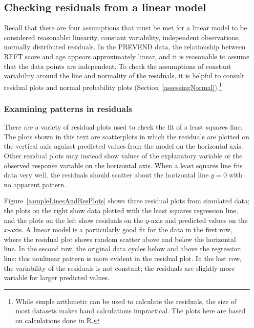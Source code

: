 \subsection{Checking residuals from a linear model}
\label{checkingResiduals}


Recall that there are four assumptions that must be met for a linear model to be considered reasonable: linearity, constant variability, independent observations, normally distributed residuals. In the PREVEND data, the relationship between RFFT score and age appears approximately linear, and it is reasonable to assume that the data points are independent. To check the assumptions of constant variability around the line and normality of the residuals, it is helpful to consult residual plots and normal probability plots (Section~\ref{assessingNormal}).\footnote{While simple arithmetic can be used to calculate the residuals, the size of most datasets makes hand calculations impractical. The plots here are based on calculations done in \textsf{R}.}

\subsubsection{Examining patterns in residuals}

There are a variety of residual plots used to check the fit of a least squares line. The plots shown in this text are scatterplots in which the residuals are plotted on the vertical axis against predicted values from the model on the horizontal axis. Other residual plots may instead show values of the explanatory variable or the observed response variable on the horizontal axis. When a least squares line fits data very well, the residuals should scatter about the horizontal line $y = 0$ with no apparent pattern.

Figure~\ref{sampleLinesAndResPlots} shows three residual plots from simulated data; the plots on the right show data plotted with the least squares regression line, and the plots on the left show residuals on the $y$-axis and predicted values on the $x$-axis. A linear model is a particularly good fit for the data in the first row, where the residual plot shows random scatter above and below the horizontal line. In the second row, the original data cycles below and above the regression line; this nonlinear pattern is more evident in the residual plot. In the last row, the variability of the residuals is not constant; the residuals are slightly more variable for larger predicted values.

